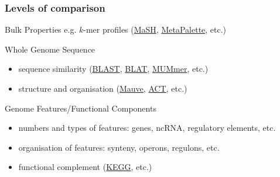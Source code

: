 \begin{frame}
  \frametitle{Levels of comparison}
    \begin{alertblock}{Bulk Properties}
      \textcolor{hutton_green}{e.g. $k$-mer profiles} (\textcolor{hutton_purple}{\href{https://github.com/marbl/Mash}{MaSH}}, \textcolor{hutton_purple}{\href{https://github.com/dkoslicki/MetaPalette}{MetaPalette}}, etc.)
    \end{alertblock}
    \begin{block}{Whole Genome Sequence}
      \begin{itemize}
        \item \textcolor{hutton_blue}{sequence similarity} (\textcolor{hutton_purple}{\href{https://blast.ncbi.nlm.nih.gov/Blast.cgi?PAGE_TYPE=BlastDocs&DOC_TYPE=Download}{BLAST}}, \textcolor{hutton_purple}{\href{https://genome.ucsc.edu/FAQ/FAQblat.html}{BLAT}}, \textcolor{hutton_purple}{\href{http://mummer.sourceforge.net/}{MUMmer}}, etc.)
        \item \textcolor{hutton_blue}{structure and organisation} (\textcolor{hutton_purple}{\href{http://darlinglab.org/mauve/mauve.html}{Mauve}}, \textcolor{hutton_purple}{\href{http://www.sanger.ac.uk/science/tools/artemis-comparison-tool-act}{ACT}}, etc.)
      \end{itemize}
    \end{block}
    \begin{alertblock}{Genome Features/Functional Components}
      \begin{itemize}
        \item \textcolor{RawSienna}{numbers and types of features: genes, ncRNA, regulatory elements, etc.}
        \item \textcolor{RawSienna}{organisation of features: synteny, operons, regulons, etc.}
        \item \textcolor{RawSienna}{functional complement} (\textcolor{hutton_purple}{\href{http://www.genome.jp/kegg/}{KEGG}}, etc.)
      \end{itemize}
    \end{alertblock}
\end{frame}

